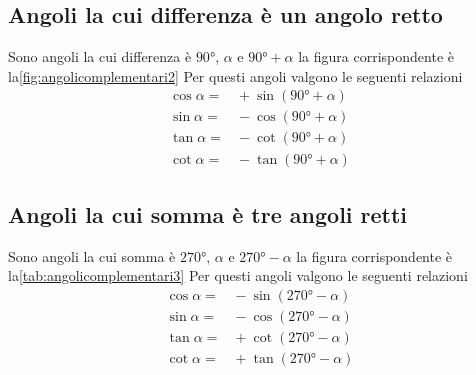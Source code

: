 \subsection{Angoli la cui differenza è un angolo retto}
Sono angoli la cui differenza è $\ang{90}$, $\alpha$ e $\ang{90}+\alpha$ la figura corrispondente è la\nobs\vref{fig:angolicomplementari2}
%	
Per questi angoli valgono le seguenti relazioni
\begin{align*}
\cos\alpha=&{}+\sin(\ang{90}+\alpha)\\
\sin\alpha=&{}-\cos(\ang{90}+\alpha)\\
\tan\alpha=&{}-\cot(\ang{90}+\alpha)\\
\cot\alpha=&{}-\tan(\ang{90}+\alpha)
\end{align*}
\subsection{Angoli la cui somma è tre angoli retti}
Sono angoli la cui somma è $\ang{270}$, $\alpha$ e $\ang{270}-\alpha$ la figura corrispondente è la\nobs\vref{tab:angolicomplementari3}
%		
Per questi angoli valgono le seguenti relazioni
\begin{align*}
\cos\alpha=&{}-\sin(\ang{270}-\alpha)\\
\sin\alpha=&{}-\cos(\ang{270}-\alpha)\\
\tan\alpha=&{}+\cot(\ang{270}-\alpha)\\
\cot\alpha=&{}+\tan(\ang{270}-\alpha)
\end{align*}
